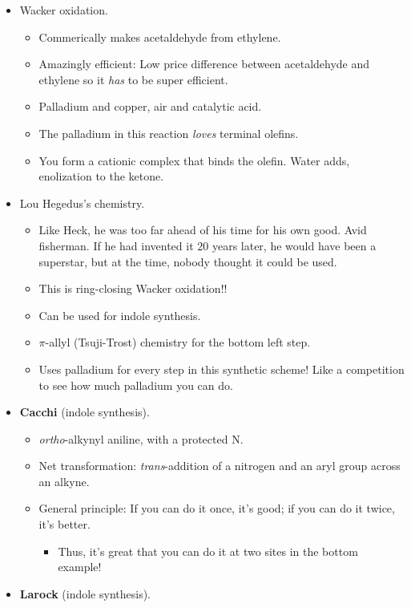 \documentclass[../notes.tex]{subfiles}
\begin{document}
\begin{itemize}
    \item Wacker oxidation.
    \begin{itemize}
        \item Commerically makes acetaldehyde from ethylene.
        \item Amazingly efficient: Low price difference between acetaldehyde and ethylene so it \emph{has} to be super efficient.
        \item Palladium and copper, air and catalytic acid.
        \item The palladium in this reaction \emph{loves} terminal olefins.
        \item You form a cationic  complex that binds the olefin. Water adds, enolization to the ketone.
    \end{itemize}
    \item Lou Hegedus's chemistry.
    \begin{itemize}
        \item Like Heck, he was too far ahead of his time for his own good. Avid fisherman. If he had invented it 20 years later, he would have been a superstar, but at the time, nobody thought it could be used.
        \item This is ring-closing Wacker oxidation!!
        \item Can be used for indole synthesis.
        \item $\pi$-allyl (Tsuji-Trost) chemistry for the bottom left step.
        \item Uses palladium for every step in this synthetic scheme! Like a competition to see how much palladium you can do.
    \end{itemize}
    \item \textbf{Cacchi} (indole synthesis).
    \begin{itemize}
        \item \emph{ortho}-alkynyl aniline, with a protected N.
        \item Net transformation: \emph{trans}-addition of a nitrogen and an aryl group across an alkyne.
        \item General principle: If you can do it once, it's good; if you can do it twice, it's better.
        \begin{itemize}
            \item Thus, it's great that you can do it at two sites in the bottom example!
        \end{itemize}
    \end{itemize}
    \item \textbf{Larock} (indole synthesis).

\end{itemize}
\end{document}
